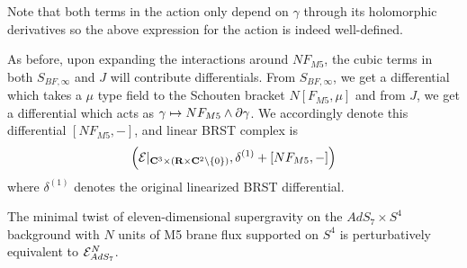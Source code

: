 \documentclass[../main.tex]{subfiles}
\begin{document}
\begin{rmk}
Note that both terms in the action only depend on $\gamma$ through its holomorphic derivatives so the above expression for the action is indeed well-defined. 

As before, upon expanding the interactions around $NF_{M5}$, the cubic terms in both $S_{BF,\infty}$ and $J$ will contribute differentials. From $S_{BF,\infty}$, we get a differential which takes a $\mu$ type field to the Schouten bracket $N[F_{M5}, \mu]$ and from $J$, we get a differential which acts as $\gamma\mapsto N F_{M5} \wedge \partial \gamma$. We accordingly denote this differential $[NF_{M5}, - ] $, and linear BRST complex is
\[
\left (\mathcal{E} |_{\mathbf{C}^3\times (\mathbf{R}\times \mathbf{C}^2\setminus \{0\} )}, \delta^{(1)} + [NF_{M5},-] \right )
\] where $\delta^{(1)}$ denotes the original linearized BRST differential.
\end{rmk}

\begin{conj}\label{conj:ads7}
The minimal twist of eleven-dimensional supergravity on the $AdS_7\times S^4$ background with $N$ units of M5 brane flux supported on $S^4$ is perturbatively equivalent to $\mathcal{E}^N_{AdS_7}$. 
\end{conj}

\end{document}
